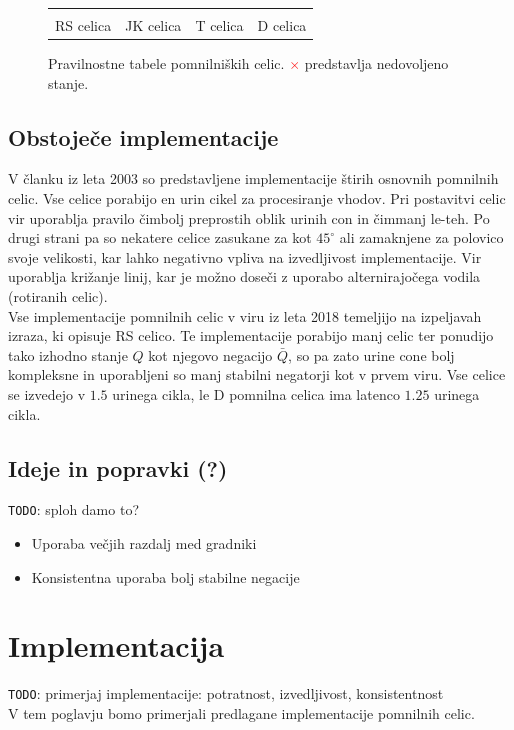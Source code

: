 \documentclass[a4paper, 11pt]{article}
\newcommand{\todo}{\textcolor{BrickRed}{\texttt{TODO}}} %
\begin{document}
\begin{figure}[h]
\begin{tabular}{cccc}
		\\ \\
		RS celica & JK celica & T celica & D celica \\
	\end{tabular}
	\caption{Pravilnostne tabele pomnilniških celic. \textcolor{Red}{$\times$} predstavlja nedovoljeno stanje.}
	\label{tab-cells-table}
\end{figure}


\subsection{Obstoječe implementacije}
V članku \cite{quantum_dot} iz leta 2003 so predstavljene implementacije štirih osnovnih pomnilnih celic. Vse celice porabijo en urin cikel za procesiranje vhodov. Pri postavitvi celic vir uporablja pravilo čimbolj preprostih oblik urinih con in čimmanj le-teh. Po drugi strani pa so nekatere celice zasukane za kot $ 45^{\circ} $ ali zamaknjene za polovico svoje velikosti, kar lahko negativno vpliva na izvedljivost implementacije. Vir uporablja križanje linij, kar je možno doseči z uporabo alternirajočega vodila (rotiranih celic). \\

Vse implementacije pomnilnih celic v viru \cite{a_novel_approach} iz leta 2018 temeljijo na izpeljavah izraza, ki opisuje RS celico. Te implementacije porabijo manj celic ter ponudijo tako izhodno stanje $Q$ kot njegovo negacijo $\bar{Q}$, so pa zato urine cone bolj kompleksne in uporabljeni so manj stabilni negatorji kot v prvem viru. Vse celice se izvedejo v $1.5$ urinega cikla, le D pomnilna celica ima latenco $1.25$ urinega cikla.


\subsection{Ideje in popravki (?)}
\todo: sploh damo to?
\begin{itemize}
\item Uporaba večjih razdalj med gradniki
\item Konsistentna uporaba bolj stabilne negacije
\end{itemize}

\section{Implementacija}
\todo: primerjaj implementacije: potratnost, izvedljivost, konsistentnost\\
V tem poglavju bomo primerjali predlagane implementacije pomnilnih celic.\\
\end{document}
